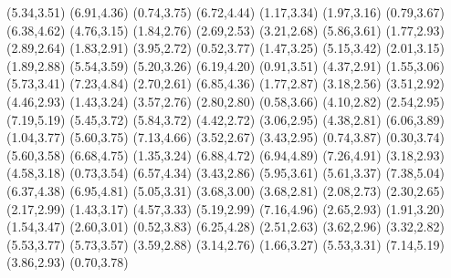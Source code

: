 \psdot[](5.34,3.51)
\psdot[](6.91,4.36)
\psdot[](0.74,3.75)
\psdot[](6.72,4.44)
\psdot[](1.17,3.34)
\psdot[](1.97,3.16)
\psdot[](0.79,3.67)
\psdot[](6.38,4.62)
\psdot[](4.76,3.15)
\psdot[](1.84,2.76)
\psdot[](2.69,2.53)
\psdot[](3.21,2.68)
\psdot[](5.86,3.61)
\psdot[](1.77,2.93)
\psdot[](2.89,2.64)
\psdot[](1.83,2.91)
\psdot[](3.95,2.72)
\psdot[](0.52,3.77)
\psdot[](1.47,3.25)
\psdot[](5.15,3.42)
\psdot[](2.01,3.15)
\psdot[](1.89,2.88)
\psdot[](5.54,3.59)
\psdot[](5.20,3.26)
\psdot[](6.19,4.20)
\psdot[](0.91,3.51)
\psdot[](4.37,2.91)
\psdot[](1.55,3.06)
\psdot[](5.73,3.41)
\psdot[](7.23,4.84)
\psdot[](2.70,2.61)
\psdot[](6.85,4.36)
\psdot[](1.77,2.87)
\psdot[](3.18,2.56)
\psdot[](3.51,2.92)
\psdot[](4.46,2.93)
\psdot[](1.43,3.24)
\psdot[](3.57,2.76)
\psdot[](2.80,2.80)
\psdot[](0.58,3.66)
\psdot[](4.10,2.82)
\psdot[](2.54,2.95)
\psdot[](7.19,5.19)
\psdot[](5.45,3.72)
\psdot[](5.84,3.72)
\psdot[](4.42,2.72)
\psdot[](3.06,2.95)
\psdot[](4.38,2.81)
\psdot[](6.06,3.89)
\psdot[](1.04,3.77)
\psdot[](5.60,3.75)
\psdot[](7.13,4.66)
\psdot[](3.52,2.67)
\psdot[](3.43,2.95)
\psdot[](0.74,3.87)
\psdot[](0.30,3.74)
\psdot[](5.60,3.58)
\psdot[](6.68,4.75)
\psdot[](1.35,3.24)
\psdot[](6.88,4.72)
\psdot[](6.94,4.89)
\psdot[](7.26,4.91)
\psdot[](3.18,2.93)
\psdot[](4.58,3.18)
\psdot[](0.73,3.54)
\psdot[](6.57,4.34)
\psdot[](3.43,2.86)
\psdot[](5.95,3.61)
\psdot[](5.61,3.37)
\psdot[](7.38,5.04)
\psdot[](6.37,4.38)
\psdot[](6.95,4.81)
\psdot[](5.05,3.31)
\psdot[](3.68,3.00)
\psdot[](3.68,2.81)
\psdot[](2.08,2.73)
\psdot[](2.30,2.65)
\psdot[](2.17,2.99)
\psdot[](1.43,3.17)
\psdot[](4.57,3.33)
\psdot[](5.19,2.99)
\psdot[](7.16,4.96)
\psdot[](2.65,2.93)
\psdot[](1.91,3.20)
\psdot[](1.54,3.47)
\psdot[](2.60,3.01)
\psdot[](0.52,3.83)
\psdot[](6.25,4.28)
\psdot[](2.51,2.63)
\psdot[](3.62,2.96)
\psdot[](3.32,2.82)
\psdot[](5.53,3.77)
\psdot[](5.73,3.57)
\psdot[](3.59,2.88)
\psdot[](3.14,2.76)
\psdot[](1.66,3.27)
\psdot[](5.53,3.31)
\psdot[](7.14,5.19)
\psdot[](3.86,2.93)
\psdot[](0.70,3.78)
